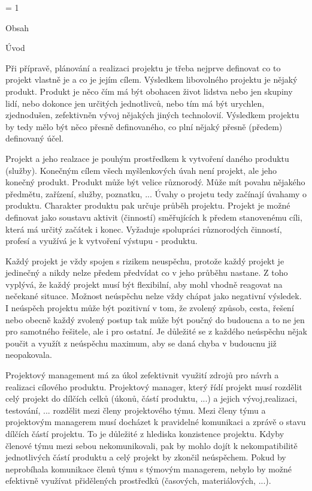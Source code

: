 



\pageno = 1

\nonum\notoc\sec Obsah

\maketoc

\vfill\break

\pagenumbers


\chap Úvod

Při přípravě, plánování a realizaci projektu je třeba nejprve definovat co to projekt vlastně je a co je jejím cílem. Výsledkem libovolného projektu je nějaký produkt. Produkt je něco čím má být obohacen život lidstva nebo jen skupiny lidí, nebo dokonce jen určitých jednotlivců, nebo tím má být urychlen, zjednodušen, zefektivněn vývoj nějakých jiných technolovií. Výsledkem projektu by tedy mělo být něco přesně definovaného, co plní nějaký přesně (předem) definovaný účel.

Projekt a jeho realzace je pouhým prostředkem k vytvoření daného produktu (služby). Konečným cílem všech myšlenkových úvah není projekt, ale jeho konečný produkt. Produkt může být velice různorodý. Může mít povahu nějakého předmětu, zařízení, služby, poznatku, ... Úvahy o projetu tedy začínají úvahamy o produktu. Charakter produktu pak určuje průběh projektu. Projekt je možné definovat jako soustavu aktivit (činností) směřujících k předem stanovenému cíli, která má určitý začátek i konec. Vyžaduje spolupráci různorodých činností, profesí a využívá je k vytvoření výstupu - produktu.

Každý projekt je vždy spojen s rizikem neuspěchu, protože každý projekt je jedinečný a nikdy nelze předem předvídat co v jeho průběhu nastane. Z toho vyplývá, že každý projekt musí být flexibilní, aby mohl vhodně reagovat na nečekané situace. Možnost neúspěchu nelze vždy chápat jako negativní výsledek. I neúspěch projektu může být pozitivní v tom, že zvolený způsob, cesta, řešení nebo obecně každý zvolený postup tak může být poučný do budoucna a to ne jen pro samotného řešitele, ale i pro ostatní. Je důležité se z každého neúspěchu nějak poučit a využít z neúspěchu maximum, aby se daná chyba v budoucnu již neopakovala. 

Projektový management má za úkol zefektivnit využití zdrojů pro návrh a realizaci cílového produktu. Projektový manager, který řídí projekt musí rozdělit celý projekt do dílčích celků (úkonů, částí produktu, ...) a jejich  vývoj,realizaci, testování, ... rozdělit mezi členy projektového týmu. Mezi členy týmu a projektovým managerem musí docházet k pravidelné komunikaci a zprávě o stavu dílčích částí projektu. To je důležité z hlediska konzistence projektu. Kdyby členové týmu mezi sebou nekomunikovali, pak by mohlo dojít k nekompatibilitě jednotlivých částí produktu a celý projekt by zkončil neúspěchem. Pokud by neprobíhala komunikace členů týmu s týmovým managerem, nebylo by možné efektivně využívat přidělených prostředků (časových, materiálových, ...).

